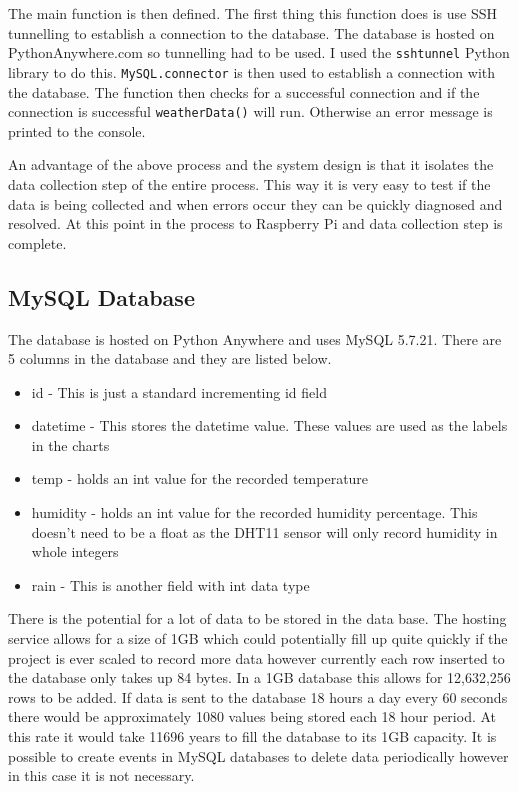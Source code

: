 \documentclass[10pt,a4paper]{article}
\begin{document}
The main function is then defined. The first thing this function does is use SSH tunnelling to establish a connection to the database. The database is hosted on PythonAnywhere.com so tunnelling had to be used. I used the \texttt{sshtunnel} Python library to do this. \texttt{MySQL.connector} is then used to establish a connection with the database. The function then checks for a successful connection and if the connection is successful \texttt{weatherData()} will run. Otherwise an error message is printed to the console. 

An advantage of the above process and the system design is that it isolates the data collection step of the entire process. This way it is very easy to test if the data is being collected and when errors occur they can be quickly diagnosed and resolved. At this point in the process to Raspberry Pi and data collection step is complete. 

\subsection{MySQL Database}
The database is hosted on Python Anywhere and uses MySQL 5.7.21. There are 5 columns in the database and they are listed below. 
\begin{itemize}
\item id - This is just a standard incrementing id field
\item datetime - This stores the datetime value. These values are used as the labels in the charts
\item temp - holds an int value for the recorded temperature
\item humidity - holds an int value for the recorded humidity percentage. This doesn't need to be a float as the DHT11 sensor will only record humidity in whole integers
\item rain - This is another field with int data type
\end{itemize}

There is the potential for a lot of data to be stored in the data base. The hosting service allows for a size of 1GB which could potentially fill up quite quickly if the project is ever scaled to record more data however currently each row inserted to the database only takes up 84 bytes. In a 1GB database this allows for 12,632,256 rows to be added. If data is sent to the database 18 hours a day every 60 seconds there would be approximately 1080 values being stored each 18 hour period. At this rate it would take 11696 years to fill the database to its 1GB capacity. It is possible to create events in MySQL databases to delete data periodically however in this case it is not necessary. 
\end{document}
